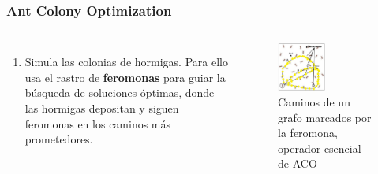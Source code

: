 \begin{frame}
  \frametitle{Ant Colony Optimization}
  \begin{columns}
    \begin{enumerate}
      \item Simula las colonias de hormigas. Para ello usa el rastro de \textbf{feromonas} para guiar la búsqueda de soluciones óptimas, donde las hormigas depositan y siguen feromonas en los caminos más prometedores.
    \end{enumerate}
    \begin{figure}
      \begin{center}
        \includegraphics[width=0.5\textwidth]{imagenes/chapter3/aco.png}
      \end{center}
      \caption{Caminos de un grafo marcados por la feromona, operador esencial de ACO}
    \end{figure}
  \end{columns}
\end{frame}

